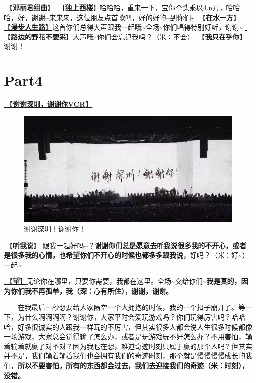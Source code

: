 \documentclass[]{ctexbook}
\begin{document}
🎵【\textbf{邓丽君组曲}】
\hyperref[one-in-the-building]{🎵【\textbf{独上西楼}】}哈哈哈，重来一下，宝你个头乘以4.n万，哈哈哈，好，谢谢\textasciitilde 来来来，这位朋友点首歌吧，好的好的\textasciitilde 到你们\textasciitilde{}
\hyperref[on-the-water-side]{🎵【\textbf{在水一方}】}
\hyperref[walk-the-road-of-life]{🎵【\textbf{漫步人生路}】}这首你们总得大声跟我一起哦\textasciitilde 全场\textasciitilde 你们唱得特别好听，谢谢\textasciitilde{}
\hyperref[only-with-me]{🎵【\textbf{路边的野花不要采}】}大声哦\textasciitilde 你们会忘记我吗？（米：不会）
\hyperref[only-you]{🎵【\textbf{我只在乎你}】}谢谢！

\section{Part4}\label{shenzhen-20240601-part4}

\hyperref[thank-you-vcr]{🎥【\textbf{谢谢深圳，谢谢你VCR}】}

\begin{figure}

{\centering \includegraphics[width=400pt]{img/shenzhen20240601/thank-shenzhen} 

}

\caption{谢谢深圳！谢谢你！}\label{fig:unnamed-chunk-46}
\end{figure}

\hyperref[listen-to-me]{🎵【\textbf{听我说}】} 跟我一起好吗\textasciitilde？\textbf{谢谢你们总是愿意去听我说很多我的不开心，或者是很多我的心情，也希望你们不开心的时候也都多多跟我说}，好吗？（米：好\textasciitilde）一起\textasciitilde{}

\hyperref[Gaze]{🎵【\textbf{望}】}无论你在哪里，只要你需要，我都在这里。全场\textasciitilde 交给你们\textasciitilde{}\textbf{我是真的，因为你们我不再孤单，我（深：心有所住），谢谢，谢谢。}

  在我最后一秒想要给大家隔空一个大拥抱的时候，我的一个扣子崩开了。等一下，为什么啊啊啊啊？谢谢你，大家平时会爱玩游戏吗？你们玩得厉害吗？哈哈哈，好多很诚实的人跟我一样玩的不厉害，但其实很多人都会说人生很多时候都像一场游戏，大家总会觉得输了怎么办，或者是玩游戏玩不好怎么办？不用害怕，输着输着就赢了对不对？因为我也在想，难道奇迹时刻只属于赢的那个人吗？但其实并不是，我们输着输着我们也会拥有我们的奇迹时刻，那个就是慢慢慢慢成长的我们，\textbf{所以不要害怕，所有的东西都会过去，我们去迎接我们的奇迹（米：时刻），没错。}
\end{document}
